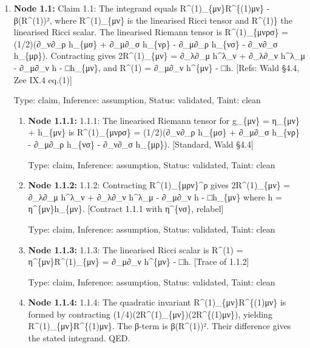 \begin{enumerate}
\item \textbf{Node 1.1:} Claim 1.1: The integrand equals R\textasciicircum{}(1)\_\{μν\}R\textasciicircum{}\{(1)μν\} - β(R\textasciicircum{}(1))², where R\textasciicircum{}(1)\_\{μν\} is the linearised Ricci tensor and R\textasciicircum{}(1)\} the linearised Ricci scalar. The linearised Riemann tensor is R\textasciicircum{}(1)\_\{μνρσ\} = (1/2)(∂\_ν∂\_ρ h\_\{μσ\} + ∂\_μ∂\_σ h\_\{νρ\} - ∂\_μ∂\_ρ h\_\{νσ\} - ∂\_ν∂\_σ h\_\{μρ\}). Contracting gives 2R\textasciicircum{}(1)\_\{μν\} = ∂\_λ∂\_μ h\textasciicircum{}λ\_ν + ∂\_λ∂\_ν h\textasciicircum{}λ\_μ - ∂\_μ∂\_ν h - □h\_\{μν\}, and R\textasciicircum{}(1) = ∂\_μ∂\_ν h\textasciicircum{}\{μν\} - □h. [Refs: Wald §4.4, Zee IX.4 eq.(1)]

  Type: claim, Inference: assumption, Status: validated, Taint: clean

\begin{enumerate}
\item \textbf{Node 1.1.1:} 1.1.1: The linearised Riemann tensor for g\_\{μν\} = η\_\{μν\} + h\_\{μν\} is R\textasciicircum{}(1)\_\{μνρσ\} = (1/2)(∂\_ν∂\_ρ h\_\{μσ\} + ∂\_μ∂\_σ h\_\{νρ\} - ∂\_μ∂\_ρ h\_\{νσ\} - ∂\_ν∂\_σ h\_\{μρ\}). [Standard, Wald §4.4]

  Type: claim, Inference: assumption, Status: validated, Taint: clean

\item \textbf{Node 1.1.2:} 1.1.2: Contracting R\textasciicircum{}(1)\_\{μρν\}\textasciicircum{}ρ gives 2R\textasciicircum{}(1)\_\{μν\} = ∂\_λ∂\_μ h\textasciicircum{}λ\_ν + ∂\_λ∂\_ν h\textasciicircum{}λ\_μ - ∂\_μ∂\_ν h - □h\_\{μν\} where h = η\textasciicircum{}\{μν\}h\_\{μν\}. [Contract 1.1.1 with η\textasciicircum{}\{νσ\}, relabel]

  Type: claim, Inference: assumption, Status: validated, Taint: clean

\item \textbf{Node 1.1.3:} 1.1.3: The linearised Ricci scalar is R\textasciicircum{}(1) = η\textasciicircum{}\{μν\}R\textasciicircum{}(1)\_\{μν\} = ∂\_μ∂\_ν h\textasciicircum{}\{μν\} - □h. [Trace of 1.1.2]

  Type: claim, Inference: assumption, Status: validated, Taint: clean

\item \textbf{Node 1.1.4:} 1.1.4: The quadratic invariant R\textasciicircum{}(1)\_\{μν\}R\textasciicircum{}\{(1)μν\} is formed by contracting (1/4)(2R\textasciicircum{}(1)\_\{μν\})(2R\textasciicircum{}\{(1)μν\}), yielding R\textasciicircum{}(1)\_\{μν\}R\textasciicircum{}\{(1)μν\}. The β-term is β(R\textasciicircum{}(1))². Their difference gives the stated integrand. QED.


\end{enumerate}
\end{enumerate}
